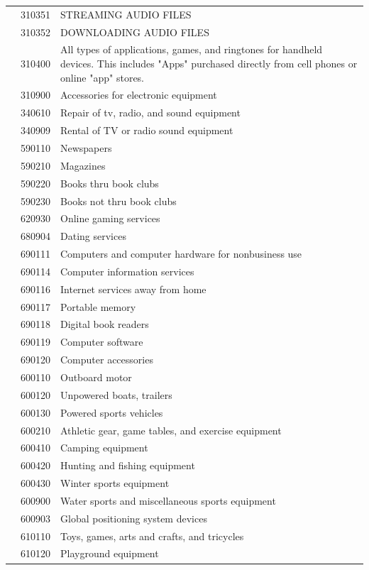 \documentclass[
]{agujournal2019}
\begin{document}
\begin{table}
{\begin{tabular*}{\linewidth}{@{\extracolsep{\fill}}l|rl}
 & 310351 & STREAMING AUDIO FILES \\ 
 & 310352 & DOWNLOADING AUDIO FILES \\ 
 & 310400 & All types of applications, games, and ringtones for handheld devices. This includes "Apps" purchased directly from cell phones or online "app" stores. \\ 
 & 310900 & Accessories for electronic equipment \\ 
 & 340610 & Repair of tv, radio, and sound equipment \\ 
 & 340909 & Rental of TV or radio sound equipment \\ 
 & 590110 & Newspapers \\ 
 & 590210 & Magazines \\ 
 & 590220 & Books thru book clubs \\ 
 & 590230 & Books not thru book clubs \\ 
 & 620930 & Online gaming services \\ 
 & 680904 & Dating services \\ 
 & 690111 & Computers and computer hardware for nonbusiness use \\ 
 & 690114 & Computer information services \\ 
 & 690116 & Internet services away from home \\ 
 & 690117 & Portable memory \\ 
 & 690118 & Digital book readers \\ 
 & 690119 & Computer software \\ 
 & 690120 & Computer accessories \\ 
 & 600110 & Outboard motor \\ 
 & 600120 & Unpowered boats, trailers \\ 
 & 600130 & Powered sports vehicles \\ 
 & 600210 & Athletic gear, game tables, and exercise equipment \\ 
 & 600410 & Camping equipment \\ 
 & 600420 & Hunting and fishing equipment \\ 
 & 600430 & Winter sports equipment \\ 
 & 600900 & Water sports and miscellaneous sports equipment \\ 
 & 600903 & Global positioning system devices \\ 
 & 610110 & Toys, games, arts and crafts, and tricycles \\ 
 & 610120 & Playground equipment \\ 

\end{tabular*}}
\end{table}
\end{document}
